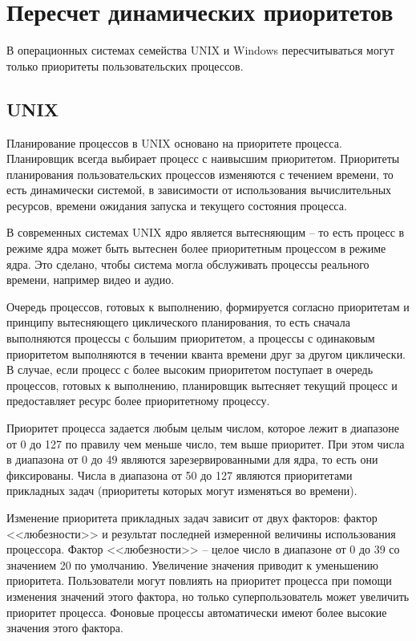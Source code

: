 \chapter{Пересчет динамических приоритетов}

В операционных системах семейства UNIX и Windows пересчитываться могут только приоритеты пользовательских процессов. 

\section{UNIX}

Планирование процессов в UNIX основано на приоритете процесса. Планировщик всегда выбирает процесс с наивысшим приоритетом. Приоритеты планирования пользовательских процессов изменяются с течением времени, то есть динамически системой, в зависимости от использования вычислительных ресурсов, времени ожидания запуска и текущего состояния процесса. 

В современных системах UNIX ядро является вытесняющим -- то есть процесс в режиме ядра может быть вытеснен более приоритетным процессом в режиме ядра. Это сделано, чтобы система могла обслуживать процессы реального времени, например видео и аудио.

Очередь процессов, готовых к выполнению, формируется согласно приоритетам и принципу вытесняющего циклического планирования, то есть сначала выполняются процессы с большим приоритетом, а процессы с одинаковым приоритетом выполняются в течении кванта времени друг за другом циклически. В случае, если процесс с более высоким приоритетом поступает в очередь процессов, готовых к выполнению, планировщик вытесняет текущий процесс и предоставляет ресурс более приоритетному процессу.

Приоритет процесса задается любым целым числом, которое лежит в диапазоне от 0 до 127 по правилу чем меньше число, тем выше приоритет.  При этом числа в диапазона от 0 до 49 являются зарезервированными для ядра, то есть они фиксированы. Числа в диапазона от 50 до 127 являются приоритетами прикладных задач (приоритеты которых могут изменяться во времени).

Изменение приоритета прикладных задач зависит от двух факторов: фактор <<любезности>> и результат последней измеренной величины использования процессора.  Фактор <<любезности>> -- целое число в диапазоне от 0 до 39 со значением 20 по умолчанию. Увеличение значения приводит к уменьшению приоритета. Пользователи могут повлиять на приоритет процесса при помощи изменения значений этого фактора, но только суперпользователь может увеличить приоритет процесса. Фоновые процессы автоматически имеют более высокие значения этого фактора.

